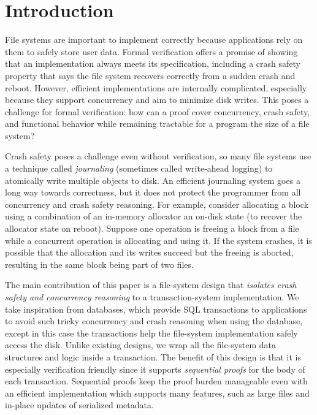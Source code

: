 \section{Introduction}

File systems are important to implement correctly because applications rely on
them to safely store user data. Formal verification offers a promise of showing
that an implementation always meets its specification, including a crash safety
property that says the file system recovers correctly from a sudden crash and
reboot. However, efficient implementations are internally complicated,
especially because they support concurrency and aim to minimize disk writes.
This poses a challenge for formal verification: how can a proof cover
concurrency, crash safety, and functional behavior while remaining tractable for
a program the size of a file system?

Crash safety poses a challenge even without verification, so many file systems
use a technique called \emph{journaling} (sometimes called write-ahead logging)
to atomically write multiple objects to disk. An efficient journaling system
goes a long way towards correctness, but it does not protect the programmer from
all concurrency and crash safety reasoning. For example, consider allocating a
block using a combination of an in-memory allocator an on-disk state (to recover
the allocator state on reboot). Suppose one operation is freeing a block from a
file while a concurrent operation is allocating and using it. If the system
crashes, it is possible that the allocation and its writes succeed but the
freeing is aborted, resulting in the same block being part of two files.

The main contribution of this paper is a file-system design that \emph{isolates
crash safety and concurrency reasoning} to a transaction-system
implementation. We take inspiration from databases, which provide SQL
transactions to applications to avoid such tricky concurrency and crash
reasoning when using the database, except in this case the transactions help the
file-system implementation safely access the disk. Unlike existing designs, we
wrap all the file-system data structures and logic inside a transaction. The
benefit of this design is that it is especially verification friendly since it
supports \emph{sequential proofs} for the body of each transaction. Sequential
proofs keep the proof burden manageable even with an efficient implementation
which supports many features, such as large files and in-place updates of
serialized metadata.

